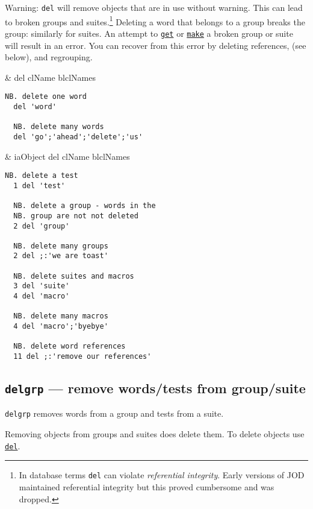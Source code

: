 Warning: \texttt{del} will remove objects that are in use without warning.
 This can lead to broken groups and suites.\footnote{In database
 terms \texttt{del} can violate \emph{referential integrity}. Early versions
 of JOD maintained referential integrity but this proved cumbersome and
 was dropped.} Deleting a word that belongs
 to a group breaks the group:  similarly for suites.
 An attempt to \hyperlink{il:get}{\texttt{get}} or \hyperlink{il:make}{\texttt{make}}
  a broken group or suite will result in an error.  You can recover from this
  error by deleting references, (see below), and regrouping.
  
\begin{wordhead}
\monad &  del clName \argsep blclNames \\
\end{wordhead}
\begin{lstlisting}[frame=single,framerule=0pt]
  NB. delete one word
  del 'word'  
  
  NB. delete many words                   
  del 'go';'ahead';'delete';'us' 
\end{lstlisting}

\begin{wordhead}
\dyad & iaObject del clName \argsep blclNames \\
\end{wordhead}
\begin{lstlisting}[frame=single,framerule=0pt]
  NB. delete a test
  1 del 'test'  
  
  NB. delete a group - words in the
  NB. group are not not deleted 
  2 del 'group' 

  NB. delete many groups
  2 del ;:'we are toast' 
  
  NB. delete suites and macros 
  3 del 'suite'           
  4 del 'macro'
  
  NB. delete many macros
  4 del 'macro';'byebye'  
  
  NB. delete word references  
  11 del ;:'remove our references'  
\end{lstlisting}

\subsection{\texttt{delgrp} ---  remove words/tests from group/suite}

\texttt{delgrp} removes words from a group and tests from a suite.  

Removing objects from groups and suites does delete them. To delete objects use 
\hyperlink{il:del}{\texttt{del}}.

